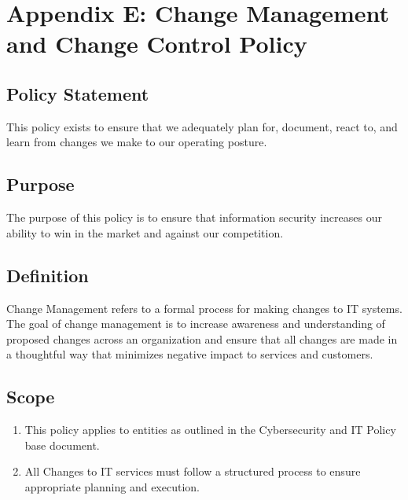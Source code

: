 \documentclass[../main.tex]{subfiles}
\begin{document}
\section{Appendix E: Change Management and Change Control Policy}
\subsection{Policy Statement}
This policy exists to ensure that we adequately plan for, document, react to, and learn from changes we make to our operating posture.
\subsection{Purpose}
The purpose of this policy is to ensure that information security increases our ability to win in the market and against our competition.
\subsection{Definition}
Change Management refers to a formal process for making changes to IT systems. The goal of change management is to increase awareness and understanding of proposed changes across an
organization and ensure that all changes are made in a thoughtful way that minimizes negative impact to services and customers.
\subsection{Scope}
\begin{enumerate}
    \item This policy applies to entities as outlined in the Cybersecurity and IT Policy base document.
    \item All Changes to IT services must follow a structured process to ensure appropriate planning and execution.
\end{enumerate}
\end{document}
